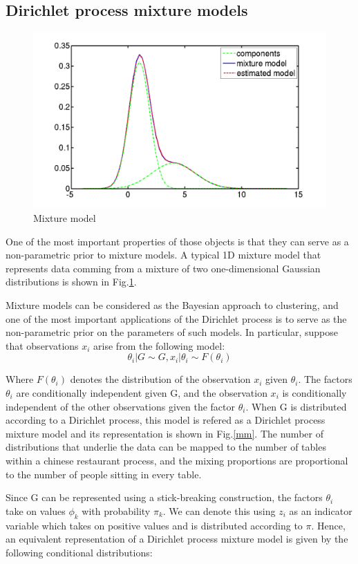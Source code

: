 \documentclass[twoside,hidelinks]{article}
\begin{document}
\subsection{Dirichlet process mixture models}

\begin{figure}[!ht]
    \centerline{\includegraphics[width=.45\textwidth]{1DGMM}}
	\caption{Mixture model}
	\label{1dGMM}
\end{figure}

One of the most important properties of those objects is that they can serve as a non-parametric prior to mixture models. A typical 1D mixture model that represents data comming from a mixture of two one-dimensional Gaussian distributions is shown in Fig.\ref{1dGMM}.

Mixture models can be considered as the Bayesian approach to clustering, and one of the most important applications of the Dirichlet process is to serve as the non-parametric prior on the parameters of such models. In particular, suppose that observations $x_i$ arise from the following model:
	\begin{equation}
			\theta_i | G \sim G ,
			x_i | \theta_i \sim F(\theta_i )
	\end{equation}

Where $F(\theta_i )$ denotes the distribution of the observation $x_i$ given $\theta_i $. The factors $ \theta_i $ are conditionally independent given G, and the observation $x_i$ is conditionally independent of the other observations given the factor $\theta_i$. When G is distributed according to a Dirichlet process, this model is refered as a Dirichlet process mixture model and its representation is shown in Fig.\ref{mm}. The number of distributions that underlie the data can be mapped to the number of tables within a chinese restaurant process, and the mixing proportions are proportional to the number of people sitting in every table.

Since G can be represented using a stick-breaking construction, the factors $ \theta_i $ take on values $\phi_k$ with probability $\pi_k$. We can denote this using $z_i$ as an indicator variable which takes on positive values and is distributed according to \textbf{$\pi$}. Hence, an equivalent representation of a Dirichlet process mixture model  is given by the following conditional distributions:
\end{document}
